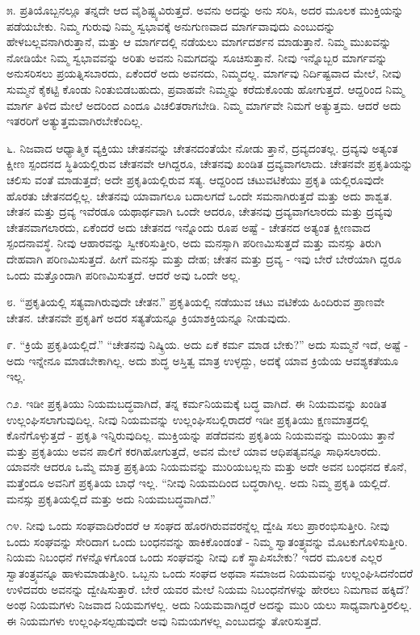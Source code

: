 ೫. ಪ್ರತಿಯೊಬ್ಬನಲ್ಲೂ ತನ್ನದೇ ಆದ ವೈಶಿಷ್ಟ್ಯವಿರುತ್ತದೆ. ಅವನು ಅದನ್ನು ಅನು ಸರಿಸಿ, ಅದರ ಮೂಲಕ ಮುಕ್ತಿಯನ್ನು ಪಡೆಯಬೇಕು. ನಿಮ್ಮ ಗುರುವು ನಿಮ್ಮ ಸ್ವಭಾವಕ್ಕೆ ಅನುಗುಣವಾದ ಮಾರ್ಗವಾವುದು ಎಂಬುದನ್ನು ಹೇಳಬಲ್ಲವನಾಗಿರುತ್ತಾನೆ, ಮತ್ತು ಆ ಮಾರ್ಗದಲ್ಲಿ ನಡೆಯಲು ಮಾರ್ಗದರ್ಶನ ಮಾಡುತ್ತಾನೆ. ನಿಮ್ಮ ಮುಖವನ್ನು ನೋಡಿಯೇ ನಿಮ್ಮ ಸ್ವಭಾವವನ್ನು ಅರಿತು ಅವನು ನಿಮಗದನ್ನು ಸೂಚಿಸುತ್ತಾನೆ. ನೀವು ಇನ್ನೊಬ್ಬರ ಮಾರ್ಗವನ್ನು ಅನುಸರಿಸಲು ಪ್ರಯತ್ನಿಸಬಾರದು, ಏಕೆಂದರೆ ಅದು ಅವನದು, ನಿಮ್ಮದಲ್ಲ. ಮಾರ್ಗವು ನಿರ್ದಿಷ್ಟವಾದ ಮೇಲೆ, ನೀವು ಸುಮ್ಮನೆ ಕೈಕಟ್ಟಿ ಕೊಂಡು ನಿಂತುಬಿಡಬಹುದು, ಪ್ರವಾಹವೇ ನಿಮ್ಮನ್ನು ಕರೆದುಕೊಂಡು ಹೋಗುತ್ತದೆ. ಆದ್ದರಿಂದ ನಿಮ್ಮ ಮಾರ್ಗ ತಿಳಿದ ಮೇಲೆ ಅದರಿಂದ ಎಂದೂ ವಿಚಲಿತರಾಗಬೇಡಿ. ನಿಮ್ಮ ಮಾರ್ಗವೇ ನಿಮಗೆ ಅತ್ಯುತ್ತಮ. ಆದರೆ ಅದು ಇತರರಿಗೆ ಅತ್ಯುತ್ತಮವಾಗಿರಬೇಕೆಂದಿಲ್ಲ.

೬. ನಿಜವಾದ ಆಧ್ಯಾತ್ಮಿಕ ವ್ಯಕ್ತಿಯು ಚೇತನವನ್ನು ಚೇತನದಂತೆಯೇ ನೋಡು ತ್ತಾನೆ, ದ್ರವ್ಯದಂತಲ್ಲ. ದ್ರವ್ಯವು ಅತ್ಯಂತ ಕ್ಷೀಣ ಸ್ಪಂದನದ ಸ್ಥಿತಿಯಲ್ಲಿರುವ ಚೇತನವೇ ಆಗಿದ್ದರೂ, ಚೇತನವು ಖಂಡಿತ ದ್ರವ್ಯವಾಗಲಾದು. ಚೇತನವೇ ಪ್ರಕೃತಿಯನ್ನು ಚಲಿಸು ವಂತೆ ಮಾಡುತ್ತದೆ; ಅದೇ ಪ್ರಕೃತಿಯಲ್ಲಿರುವ ಸತ್ಯ. ಆದ್ದರಿಂದ ಚಟುವಟಿಕೆಯು ಪ್ರಕೃತಿ ಯಲ್ಲಿರೂವುದೇ ಹೊರತು ಚೇತನದಲ್ಲಿಲ್ಲ. ಚೇತನವು ಯಾವಾಗಲೂ ಬದಾಲಗದೆ ಒಂದೇ ಸಮನಾಗಿರುತ್ತದೆ ಮತ್ತು ಅದು ಶಾಶ್ವತ. ಚೇತನ ಮತ್ತು ದ್ರವ್ಯ ಇವೆರಡೂ ಯಥಾರ್ಥವಾಗಿ ಒಂದೇ ಆದರೂ, ಚೇತನವು ದ್ರವ್ಯವಾಗಲಾರದು ಮತ್ತು ದ್ರವ್ಯವು ಚೇತನವಾಗಲಾರದು, ಏಕೆಂದರೆ ಅದು ಚೇತನದ ಇನ್ನೊಂದು ರೂಪ ಅಷ್ಟೆ - ಚೇತನದ ಅತ್ಯಂತ ಕ್ಷೀಣವಾದ ಸ್ಪಂದನಾವಸ್ಥೆ. ನೀವು ಆಹಾರವನ್ನು ಸ್ವೀಕರಿಸುತ್ತೀರಿ, ಅದು ಮನಸ್ಸಾಗಿ ಪರಿಣಮಿಸುತ್ತದೆ ಮತ್ತು ಮನಸ್ಸು ತಿರುಗಿ ದೇಹವಾಗಿ ಪರಿಣಮಿಸುತ್ತದೆ. ಹೀಗೆ ಮನಸ್ಸು ಮತ್ತು ದೇಹ; ಚೇತನ ಮತ್ತು ದ್ರವ್ಯ - ಇವು ಬೇರೆ ಬೇರೆಯಾಗಿ ದ್ದರೂ ಒಂದು ಮತ್ತೊಂದಾಗಿ ಪರಿಣಮಿಸುತ್ತದೆ. ಆದರೆ ಅವು ಒಂದೇ ಅಲ್ಲ.

೮. “ಪ್ರಕೃತಿಯಲ್ಲಿ ಸತ್ಯವಾಗಿರುವುದೇ ಚೇತನ.” ಪ್ರಕೃತಿಯಲ್ಲಿ ನಡೆಯುವ ಚಟು ವಟಿಕೆಯ ಹಿಂದಿರುವ ಪ್ರಾಣವೇ ಚೇತನ. ಚೇತನವೇ ಪ್ರಕೃತಿಗೆ ಅದರ ಸತ್ಯತೆಯನ್ನೂ ಕ್ರಿಯಾಶಕ್ತಿಯನ್ನೂ ನೀಡುವುದು.

೯. “ಕ್ರಿಯೆ ಪ್ರಕೃತಿಯಲ್ಲಿದೆ.” “ಚೇತನವು ನಿಷ್ಕ್ರಿಯ. ಅದು ಏಕೆ ಕರ್ಮ ಮಾಡ ಬೇಕು?” ಅದು ಸುಮ್ಮನೆ ಇದೆ, ಅಷ್ಟೆ - ಅದು ಇನ್ನೇನೂ ಮಾಡಬೇಕಾಗಿಲ್ಲ. ಅದು ಶುದ್ಧ ಅಸ್ತಿತ್ವ ಮಾತ್ರ ಉಳ್ಳದ್ದು, ಅದಕ್ಕೆ ಯಾವ ಕ್ರಿಯೆಯ ಆವಶ್ಯಕತೆಯೂ ಇಲ್ಲ.

೧೨. ಇಡೀ ಪ್ರಕೃತಿಯು ನಿಯಮಬದ್ಧವಾಗಿದೆ, ತನ್ನ ಕರ್ಮನಿಯಮಕ್ಕೆ ಬದ್ಧ ವಾಗಿದೆ. ಈ ನಿಯಮವನ್ನು ಖಂಡಿತ ಉಲ್ಲಂಘಿಸಲಾಗುವುದಿಲ್ಲ. ನೀವು ನಿಯಮವನ್ನು ಉಲ್ಲಂಘಿಸಬಲ್ಲಿರಾದರೆ ಇಡೀ ಪ್ರಕೃತಿಯು ಕ್ಷಣಮಾತ್ರದಲ್ಲಿ ಕೊನೆಗೊಳ್ಳುತ್ತದೆ - ಪ್ರಕೃತಿ ಇನ್ನಿರುವುದಿಲ್ಲ. ಮುಕ್ತಿಯನ್ನು ಪಡೆದವನು ಪ್ರಕೃತಿಯ ನಿಯಮವನ್ನು ಮುರಿಯು ತ್ತಾನೆ ಮತ್ತು ಪ್ರಕೃತಿಯು ಅವನ ಪಾಲಿಗೆ ಕರಗಿಹೋಗುತ್ತದೆ, ಅವನ ಮೇಲೆ ಯಾವ ಆಧಿಪತ್ಯವನ್ನೂ ಸಾಧಿಸಲಾರದು. ಯಾವನೇ ಆದರೂ ಒಮ್ಮೆ ಮಾತ್ರ ಪ್ರಕೃತಿಯ ನಿಯಮವನ್ನು ಮುರಿಯಬಲ್ಲನು ಮತ್ತು ಅದೇ ಅವನ ಬಂಧನದ ಕೊನೆ, ಮತ್ತೆಂದೂ ಅವನಿಗೆ ಪ್ರಕೃತಿಯ ಬಾಧೆ ಇಲ್ಲ. “ನೀವು ನಿಯಮದಿಂದ ಬದ್ಧರಾಗಿಲ್ಲ. ಅದು ನಿಮ್ಮ ಪ್ರಕೃತಿ ಯಲ್ಲಿದೆ. ಮನಸ್ಸು ಪ್ರಕೃತಿಯಲ್ಲಿದೆ ಮತ್ತು ಅದು ನಿಯಮಬದ್ಧವಾಗಿದೆ.”

೧೪. ನೀವು ಒಂದು ಸಂಘವಾದಿರೆಂದರೆ ಆ ಸಂಘದ ಹೊರಗಿರುವವರನ್ನೆಲ್ಲ ದ್ವೇಷಿ ಸಲು ಪ್ರಾರಂಭಿಸುತ್ತೀರಿ. ನೀವು ಒಂದು ಸಂಘವನ್ನು ಸೇರಿದಾಗ ಒಂದು ಬಂಧನವನ್ನು ಹಾಕಿಕೊಂಡಂತೆ - ನಿಮ್ಮ ಸ್ವಾತಂತ್ರ್ಯವನ್ನು ಮೊಟಕುಗೊಳಿಸುತ್ತೀರಿ. ನಿಯಮ ನಿಬಂಧನೆ ಗಳನ್ನೊಳಗೊಂಡ ಒಂದು ಸಂಘವನ್ನು ನೀವು ಏಕೆ ಸ್ಥಾಪಿಸಬೇಕು? ಇದರ ಮೂಲಕ ಎಲ್ಲರ ಸ್ವಾತಂತ್ರ್ಯವನ್ನೂ ಹಾಳುಮಾಡುತ್ತೀರಿ. ಒಬ್ಬನು ಒಂದು ಸಂಘದ ಅಥವಾ ಸಮಾಜದ ನಿಯಮವನ್ನು ಉಲ್ಲಂಘಿಸಿದನೆಂದರೆ ಉಳಿದವರು ಅವನನ್ನು ದ್ವೇಷಿಸುತ್ತಾರೆ. ಬೇರೆ ಯವರ ಮೇಲೆ ನಿಯಮ ನಿಬಂಧನೆಗಳನ್ನು ಹೇರಲು ನಿಮಗಾವ ಹಕ್ಕಿದೆ? ಅಂಥ ನಿಯಮಗಳು ನಿಜವಾದ ನಿಯಮಗಳಲ್ಲ. ಅದು ನಿಯಮವಾಗಿದ್ದರೆ ಅದನ್ನು ಮುರಿ ಯಲು ಸಾಧ್ಯವಾಗುತ್ತಿರಲಿಲ್ಲ. ಈ ನಿಯಮಗಳು ಉಲ್ಲಂಘಿಸಲ್ಪಡುವುದೇ ಅವು ನಿಮಯಗಳಲ್ಲ ಎಂಬುದನ್ನು ತೋರಿಸುತ್ತದೆ.

